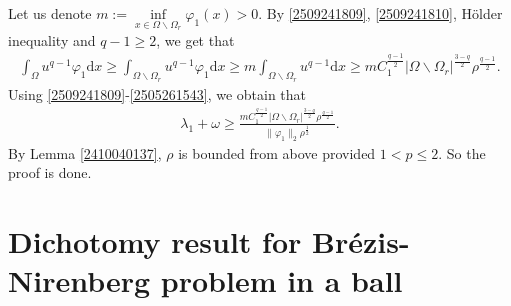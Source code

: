 \documentclass[10pt]{article}
\numberwithin{equation}{section}
\newcommand{\ud}{\mathrm{d}}
\numberwithin{equation}{section}
\begin{document}
\smallskip
Let us denote $m:=\inf\limits_{x\in \Omega\backslash\Omega_r}\varphi_1(x)>0$. By \eqref{2509241809}, \eqref{2509241810}, H\"older inequality and $q-1\ge 2$, we get that
\begin{equation}\label{2505261543}
\begin{aligned}
\int_{\Omega}u^{q-1}\varphi_1 \ud x\ge \int_{\Omega\backslash\Omega_r}u^{q-1}\varphi_1 \ud x\ge m\int_{\Omega\backslash\Omega_r}u^{q-1} \ud x\ge mC_1^{\frac{q-1}{2}}|\Omega\backslash\Omega_r|^{\frac{3-q}{2}}\rho^{\frac{q-1}{2}}.
\end{aligned}
\end{equation}
Using \eqref{2509241809}-\eqref{2505261543}, we obtain that
\begin{equation*}
\begin{aligned}
\lambda_1+\omega\ge  \frac{mC_1^{\frac{q-1}{2}}|\Omega\backslash\Omega_r|^{\frac{3-q}{2}}\rho^{\frac{q-1}{2}}}
{\|\varphi_1\|_2\rho^{\frac12}}.
\end{aligned}
\end{equation*}
 By Lemma \ref{2410040137}, $\rho$ is bounded from above provided $1<p\le 2$. So the proof is done.

\section{Dichotomy result for Br\'{e}zis-Nirenberg problem in a ball}\label{S_5}
\end{document}

